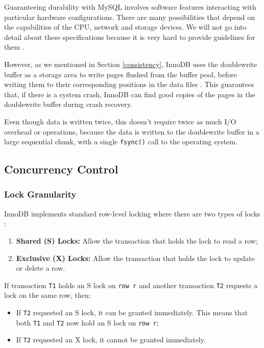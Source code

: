 \documentclass[12pt]{article}
\begin{document}
Guaranteeing durability with MySQL involves software features interacting with particular hardware configurations. There are many possibilities that depend on the capabilities of the CPU, network and storage devices. We will not go into detail about these specifications because it is very hard to provide guidelines for them \parencite{innodbACID}.

However, as we mentioned in Section \ref{consistency}, InnoDB uses the doublewrite buffer as a storage area to write pages flushed from the buffer pool, before writing them to their corresponding positions in the data files \parencite{DoubleWriteBuffer}. This guarantees that, if there is a system crash, InnoDB can find good copies of the pages in the doublewrite buffer during crash recovery.

Even though data is written twice, this doesn't require twice as much I/O overhead or operations, because the data is written to the doublewrite buffer in a large sequential chunk, with a single \verb|fsync()| call to the operating system.



\subsection{Concurrency Control}
\label{concurrencyControl}

\subsubsection{Lock Granularity}
\label{lockGranularity} 
InnoDB implements standard row-level locking where there are two types of locks \parencite{innoDBLocking}:

\begin{enumerate}
    \item \textbf{Shared (S) Locks:} Allow the transaction that holds the lock to read a row;
    
    \item \textbf{Exclusive (X) Locks:} Allow the transaction that holds the lock to update or delete a row.
\end{enumerate}


If transaction \verb|T1| holds an S lock on \verb|row r| and another transaction \verb|T2| requests a lock on the same row, then:

\begin{itemize}
    \item If \verb|T2| requested an S lock, it can be granted immediately. This means that both \verb|T1| and \verb|T2| now hold an S lock on \verb|row r|;
    
    \item If \verb|T2| requested an X lock, it cannot be granted immediately.

\end{itemize}
\end{document}
